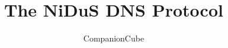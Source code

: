 \documentclass[]{report}
\title{The NiDuS DNS Protocol}
\author{CompanionCube}
\begin{document}
\maketitle

\begin{abstract}
\end{abstract}
\end{document}
